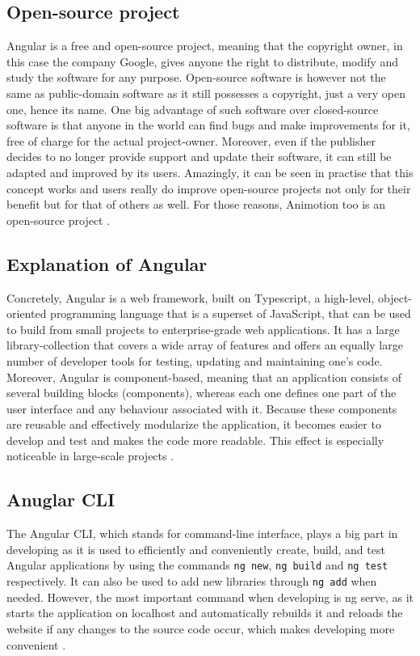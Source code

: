 \subsection{Open-source project}
Angular is a free and open-source project, meaning that the copyright owner, in this case the company Google,
gives anyone the right to distribute, modify and study the software for any purpose. Open-source software is 
however not the same as public-domain software as it still possesses a copyright, just a very open one, hence its name. 
One big advantage of such software over closed-source software is that anyone in the world can find bugs and make 
improvements for it, free of charge for the actual project-owner. Moreover, even if the publisher decides to no longer 
provide support and update their software, it can still be adapted and improved by its users. Amazingly, it can be seen 
in practise that this concept works and users really do improve open-source projects not only for their benefit but for 
that of others as well. For those reasons, Animotion too is an open-source project \cite{Opensource}.
\\
\subsection{Explanation of Angular}
Concretely, Angular is a web framework, built on Typescript, a high-level, object-oriented programming language that is 
a superset of JavaScript, that can be used to build from small projects to enterprise-grade web applications. It has a 
large library-collection that covers a wide array of features and offers an equally large number of developer tools for 
testing, updating and maintaining one's code. Moreover, Angular is component-based, meaning that an application consists 
of several building blocks (components), whereas each one defines one part of the user interface and any behaviour associated 
with it. Because these components are reusable and effectively modularize the application, it becomes easier to develop and 
test and makes the code more readable. This effect is especially noticeable in large-scale projects \cite{AngularDescription}.
\\
\subsection{Anuglar CLI}
The Angular CLI, which stands for command-line interface, plays a big part in developing as it is used to efficiently and 
conveniently create, build, and test Angular applications by using the commands \texttt{ng new}, \texttt{ng build}
and \texttt{ng test} respectively. It can also be used to add new libraries through \texttt{ng add}
when needed. However, the most important command when developing is ng serve, as it starts the application on
localhost and automatically rebuilds it and reloads the website if any changes to the source code occur, which makes 
developing more convenient \cite{AngularCLI}.
\\
